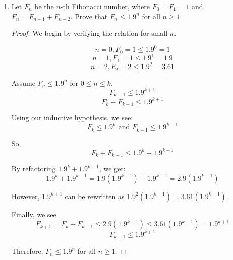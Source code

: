 \documentclass{article}
\begin{document}
\begin{enumerate}
{\begin{proof}
            Thus,
            \[9^k = 4m - 5^k + 2\]
            and
            \[5^k = 4m - 9^k + 2\]

            Then, we see if the relation holds for \(n = k+1\). 
            \[9^{k+1} + 5^{k+1} - 2\]
            \[9(9^k) + 5(5^k) - 2\]
            \[9(4m - 5^k + 2) + 5(4m - 9^k + 2) - 2\]
            \[36m - 9(5^k) + 18 + 20m - 5(9^k) + 10 - 2\]
            \[56m - 9(5^k) + 5(9^k) + 26\]
            \[56m - 45(\frac{5^k}{5} + \frac{9^k}{9}) + 26\]
            \[56m - 45(5^{k-1} + 9^{k-1} - 2) - 2(45) + 26\]
            \[56m - 45(5^{k-1} + 9^{k-1} - 2) - 64\]
            
            Now, we can use our inductive hypothesis to say 
            \(5^{k-1} + 9^{k-1} - 2 = 4m_1\)

            Thus we have 
            \[9^{k+1} + 5^{k+1} - 2 = 56m - 45(4m_1) - 64 = 4(14m - 45m_1 - 16)\]

            Therefore, \(9^n + 5^n - 2\) is divisible by 4 for all \(n \ge 1\).
        \end{proof}
    }

    \item {
        Let \(F_n\) be the \(n\)-th Fibonacci number, where \(F_0 = F_1 = 1\)
        and \(F_n = F_{n-1} + F_{n-2}\). Prove that \(F_n \le 1.9^n\) for all
        \(n \ge 1\).

        \begin{proof}
            We begin by verifying the relation for small \(n\).

            \[n = 0, F_0 = 1 \le 1.9^0 = 1\]
            \[n = 1, F_1 = 1 \le 1.9^1 = 1.9\]
            \[n = 2, F_2 = 2 \le 1.9^2 = 3.61\]

            Assume \(F_n \le 1.9^n\) for \(0 \le n \le k\).
            \[F_{k+1} \le 1.9^{k+1}\]
            \[F_k + F_{k-1} \le 1.9^{k+1}\]

            Using our inductive hypothesis, we see:
            \[F_k \le 1.9^k \text{ and } F_{k-1} \le 1.9^{k-1}\]

            So,
            \[F_k + F_{k-1} \le 1.9^k + 1.9^{k-1}\] 

            By refactoring \(1.9^k + 1.9^{k-1}\), we get:
            \[1.9^k + 1.9^{k-1} = 1.9(1.9^{k-1}) + 1.9^{k-1} = 2.9(1.9^{k-1})\]

            However, \(1.9^{k+1}\) can be rewritten as \(1.9^2 (1.9^{k-1}) = 3.61(1.9^{k-1})\).

            Finally, we see
            \[F_{k+1} = F_k + F_{k-1} \le 2.9(1.9^{k-1}) \le 3.61(1.9^{k-1}) = 1.9^{k+1}\]
            \[F_{k+1} \le 1.9^{k+1}\]

            Therefore, \(F_n \le 1.9^n\) for all \(n \ge 1\).
        \end{proof}
    }
\end{enumerate}
\end{document}
